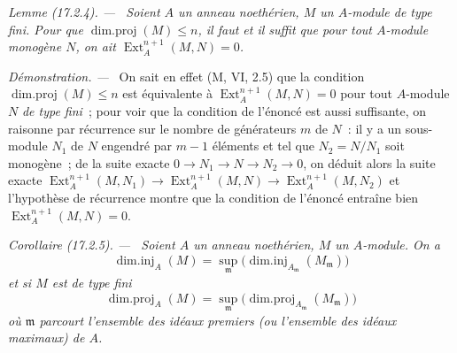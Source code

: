 \documentclass[10pt,oneside]{book}
\makeatletter
\newcommand{\setmanualcurrentlabel}[1]{\def\@currentlabel{#1}}
\newenvironment{corollary}[1][]{%
  \setmanualcurrentlabel{#1}\par\medskip\noindent\itshape Corollaire (#1). ---\ }{\par}
\newenvironment{lemma}[1][]{%
  \setmanualcurrentlabel{#1}\par\medskip\noindent\itshape Lemme (#1). ---\ }{\par}
\newenvironment{proof}{%
  \par\medskip\noindent\textit{Démonstration. ---\ }}{\par}
\makeatother
\begin{document}
\begin{lemma}[17.2.4]
\label{0.17.2.4-fr}
Soient $A$ un anneau noethérien, $M$ un $A$-module de type fini. Pour que
$\operatorname{dim.proj}(M)\leq n$, il faut et il suffit que pour tout
$A$-module monogène $N$, on ait $\operatorname{Ext}^{n+1}_A(M,N)=0$.
\end{lemma}

\begin{proof}
On sait en effet (M, VI, 2.5) que la condition
$\operatorname{dim.proj}(M)\leq n$ est équivalente à
$\operatorname{Ext}^{n+1}_A(M,N)=0$ pour tout $A$-module $N$ \emph{de type
fini}~; pour voir que la condition de l'énoncé est aussi suffisante, on
raisonne par récurrence sur le nombre de générateurs $m$ de $N$~: il y a un
sous-module $N_1$ de $N$ engendré par $m-1$ éléments et tel que
$N_2=N/N_1$ soit monogène~; de la suite exacte
$0\longrightarrow N_1\longrightarrow N\longrightarrow N_2\longrightarrow0$,
on déduit alors la suite exacte
$\operatorname{Ext}^{n+1}_A(M,N_1)\longrightarrow
\operatorname{Ext}^{n+1}_A(M,N)\longrightarrow
\operatorname{Ext}^{n+1}_A(M,N_2)$ et l'hypothèse de récurrence montre que la
condition de l'énoncé entraîne bien $\operatorname{Ext}^{n+1}_A(M,N)=0$.
\end{proof}

\begin{corollary}[17.2.5]
\label{0.17.2.5-fr}
Soient $A$ un anneau noethérien, $M$ un $A$-module. On a
\begin{equation}
\label{0.17.2.5.1-fr}
\tag{17.2.5.1}
  \operatorname{dim.inj}_A(M)
  =\sup_{\mathfrak{m}}
  \bigl(\operatorname{dim.inj}_{A_{\mathfrak{m}}}(M_{\mathfrak{m}})\bigr)
\end{equation}
et si $M$ est \emph{de type fini}
\begin{equation}
\label{0.17.2.5.2-fr}
\tag{17.2.5.2}
  \operatorname{dim.proj}_A(M)
  =\sup_{\mathfrak{m}}
  \bigl(\operatorname{dim.proj}_{A_{\mathfrak{m}}}(M_{\mathfrak{m}})\bigr)
\end{equation}
où $\mathfrak{m}$ parcourt l'ensemble des idéaux premiers (ou l'ensemble des
idéaux maximaux) de $A$.
\end{corollary}
\end{document}
